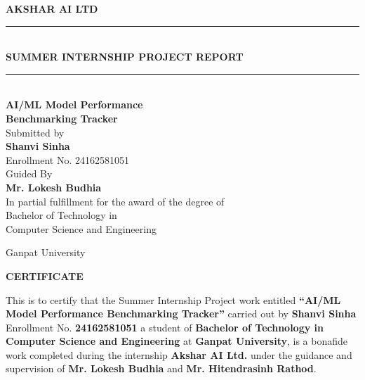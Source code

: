 \documentclass[12pt,a4paper]{report}
\begin{document}

\begin{titlepage}
\centering

{\color{blue}\Huge\textbf{AKSHAR AI LTD}}\\[1cm]

{\color{black}\rule{12cm}{1pt}}\\[1.5cm]

{\LARGE\textbf{SUMMER INTERNSHIP PROJECT REPORT}}\\[1cm]

{\color{black}\rule{12cm}{1pt}}\\[1.5cm]

{\color{red}\Huge\textbf{AI/ML Model Performance}}\\[0.3cm]
{\color{red}\Huge\textbf{Benchmarking Tracker}}\\[2cm]

Submitted by\\[0.5cm]

{\Large\textbf{Shanvi Sinha}}\\
Enrollment No. 24162581051\\[1.5cm]

Guided By\\[0.5cm]

{\Large\textbf{Mr. Lokesh Budhia}}\\[2cm]

{\color{blue}In partial fulfillment for the award of the degree of}\\Bachelor of Technology in\\
Computer Science and Engineering\\[1cm]

\vfill

Ganpat University\\[1cm]



\end{titlepage}




\begin{center}
{\Large\textbf{CERTIFICATE}}
\end{center}

\vspace{1cm}

This is to certify that the Summer Internship Project work entitled \textbf{``AI/ML Model Performance Benchmarking Tracker''} carried out by \textbf{Shanvi Sinha} Enrollment No. \textbf{24162581051} a student of \textbf{Bachelor of Technology in Computer Science and Engineering} at \textbf{Ganpat University}, is a bonafide work completed during the internship \textbf{Akshar AI Ltd.}  under the guidance and supervision of \textbf{Mr. Lokesh Budhia} and \textbf{Mr. Hitendrasinh Rathod}.
\end{document}
